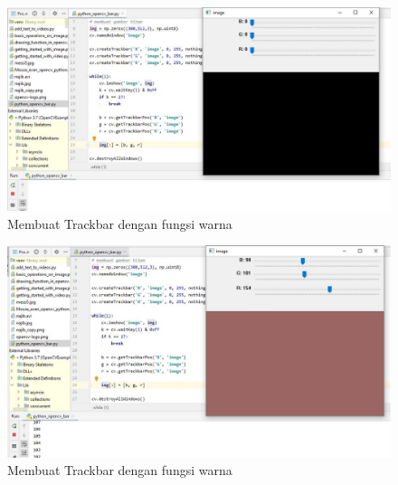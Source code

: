 \begin{figure}[ht]
\centering
\includegraphics[scale=0.45]{figures/2,31.jpg}
\caption{Membuat Trackbar dengan fungsi warna}
\label{contoh}
\end{figure}

\newpage
\begin{figure}[ht]
\centering
\includegraphics[scale=0.45]{figures/2,31,1.jpg}
\caption{Membuat Trackbar dengan fungsi warna}
\label{contoh}
\end{figure}



\newpage
